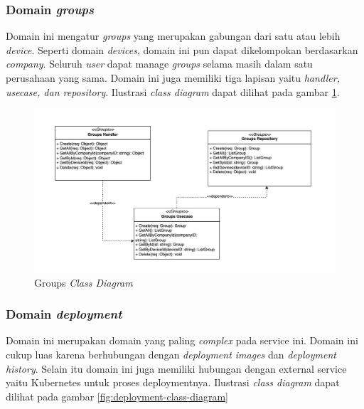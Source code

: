 \subsubsection{Domain \textit{groups}}

Domain ini mengatur \textit{groups} yang merupakan gabungan dari satu atau lebih \textit{device}. Seperti domain \textit{devices}, domain ini pun dapat dikelompokan berdasarkan \textit{company}. Seluruh \textit{user} dapat manage \textit{groups} selama masih dalam satu perusahaan yang sama. Domain ini juga memiliki tiga lapisan yaitu \textit{handler, usecase, dan repository}. Ilustrasi \textit{class diagram} dapat dilihat pada gambar \ref{fig:groups-class-diagram}.

\begin{figure}[ht]
  \centering
  \includegraphics[width=1\textwidth]{resources/chapter-3/class/groups-class-diagram.jpg}
  \caption{Groups \textit{Class Diagram}}
  \label{fig:groups-class-diagram}
\end{figure}

\pagebreak

\subsubsection{Domain \textit{deployment}}

Domain ini merupakan domain yang paling \textit{complex} pada service ini. Domain ini cukup luas karena berhubungan dengan \textit{deployment images} dan \textit{deployment history}. Selain itu domain ini juga memiliki hubungan dengan external service yaitu Kubernetes untuk proses deploymentnya. Ilustrasi \textit{class diagram} dapat dilihat pada gambar \ref{fig:deployment-class-diagram}

